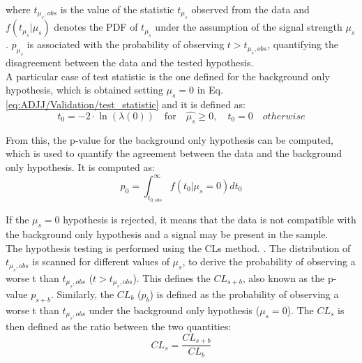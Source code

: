 \noindent where $t_{\mu_s, obs}$ is the value of the statistic $t_{\mu_s}$ observed from the data and $f(t_{\mu_s}|\mu_s)$ denotes the PDF of $t_{\mu_s}$ under the assumption of the signal strength $\mu_s$.
$p_{\mu_s}$ is associated with the probability of observing $t >t_{\mu_s,obs}$, quantifying the disagreement between the data and the tested hypothesis.\\
A particular case of test statistic is the one defined for the background only hypothesis, which is obtained setting $\mu_s=0$ in Eq. \ref{eq:ADJJ/Validation/test_statistic} and it is defined as:
\begin{equation}\label{eq:ADJJ/Validation/test_statistic_bkg}
  t_{0} = -2 \cdot \ln(\lambda(0))\quad \text{for} \quad \hat{\mu_s} \ge 0, \quad t_{0} = 0 \quad otherwise
\end{equation}

\noindent From this, the p-value for the background only hypothesis can be computed, which is used to quantify the agreement between the data and the background only hypothesis.
It is computed as:
\begin{equation}\label{eq:ADJJ/Validation/p_value_bkg}
  p_{0} = \int_{t_{0,obs}}^{\infty} f(t_{0}|\mu_s=0) dt_{0}
\end{equation}

\noindent If the $\mu_s = 0$ hypothesis is rejected, it means that the data is not compatible with the background only hypothesis and a signal may be present in the sample.\\
The hypothesis testing is performed using the CLs method. \cite{Lik_tests,CLs}.
The distribution of $t_{\mu_s,obs}$ is scanned for different values of $\mu_s$, to derive the probability of observing a worse t than $t_{\mu_s,obs}$ ($t >t_{\mu_s,obs}$).
This defines the $CL_{s+b}$, also known as the p-value $p_{s+b}$.
Similarly, the $CL_b$ ($p_b$) is defined as the probability of observing a worse t than $t_{\mu_s,obs}$ under the background only hypothesis ($\mu_s=0$).
The $CL_s$ is then defined as the ratio between the two quantities:
\begin{equation}\label{eq:ADJJ/Validation/CLs}
  CL_s = \frac{CL_{s+b}}{CL_b}
\end{equation}

